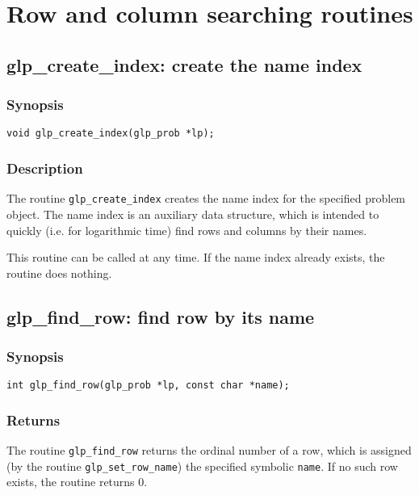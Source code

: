 \newpage

\section{Row and column searching routines}

\subsection{glp\_create\_index: create the name index}

\subsubsection*{Synopsis}

\begin{verbatim}
void glp_create_index(glp_prob *lp);
\end{verbatim}

\subsubsection*{Description}

The routine \verb|glp_create_index| creates the name index for the
specified problem object. The name index is an auxiliary data structure,
which is intended to quickly (i.e. for logarithmic time) find rows and
columns by their names.

This routine can be called at any time. If the name index already
exists, the routine does nothing.

\subsection{glp\_find\_row: find row by its name}

\subsubsection*{Synopsis}

\begin{verbatim}
int glp_find_row(glp_prob *lp, const char *name);
\end{verbatim}

\subsubsection*{Returns}

The routine \verb|glp_find_row| returns the ordinal number of a row,
which is assigned (by the routine \verb|glp_set_row_name|) the specified
symbolic \verb|name|. If no such row exists, the routine returns 0.

